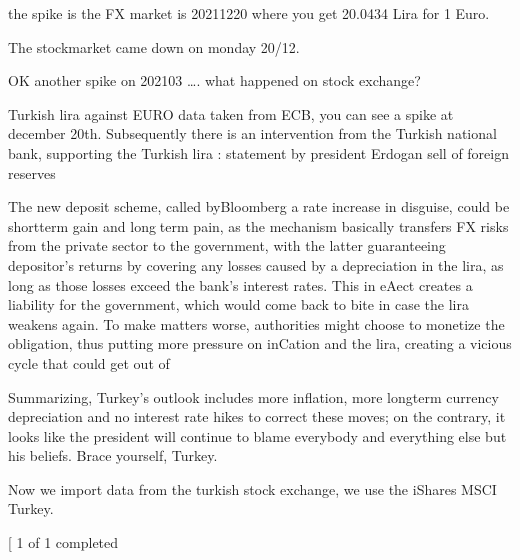\documentclass[letterpaper,10pt,english]{sphinxmanual}
\begin{document}
\sphinxAtStartPar
the spike is the FX \sphinxhyphen{} market is 2021\sphinxhyphen{}12\sphinxhyphen{}20 where you get 20.0434 Lira
for 1 Euro.

\sphinxAtStartPar
The stockmarket came down on monday 20/12.

\begin{sphinxVerbatim}[commandchars=\\\{\}]
\end{sphinxVerbatim}

\noindent{}

\sphinxAtStartPar
OK another spike on 2021\sphinxhyphen{}03 …. what happened on stock exchange?

\sphinxAtStartPar
Turkish lira against EURO \sphinxhyphen{} data taken from ECB, you can see a spike at
december 20th. Subsequently there is an intervention from the Turkish
national bank, supporting the Turkish lira : \sphinxhyphen{} statement by president
Erdogan \sphinxhyphen{} sell of foreign reserves

\sphinxAtStartPar
The new deposit scheme, called byBloomberg a rate increase in disguise,
could be short\sphinxhyphen{}term gain and longterm pain, as the mechanism basically
transfers FX risks from the private sector to the government, with the
latter guaranteeing depositor’s returns by covering any losses caused by
a depreciation in the lira, as long as those losses exceed the bank’s
interest rates. This in eAect creates a liability for the government,
which would come back to bite in case the lira weakens again. To make
matters worse, authorities might choose to monetize the obligation, thus
putting more pressure on inCation and the lira, creating a vicious cycle
that could get out of

\sphinxAtStartPar
Summarizing, Turkey’s outlook includes more inflation, more long\sphinxhyphen{}term
currency depreciation and no interest rate hikes to correct these moves;
on the contrary, it looks like the president will continue to blame
everybody and everything else but his beliefs. Brace yourself, Turkey.

\sphinxAtStartPar
Now we import data from the turkish stock exchange, we use the iShares
MSCI Turkey.
\begin{sphinxalltt}
{[}\sphinxstylestrong{*******************100\%*********************}{]}  1 of 1 completed
\end{sphinxalltt}
\end{document}
